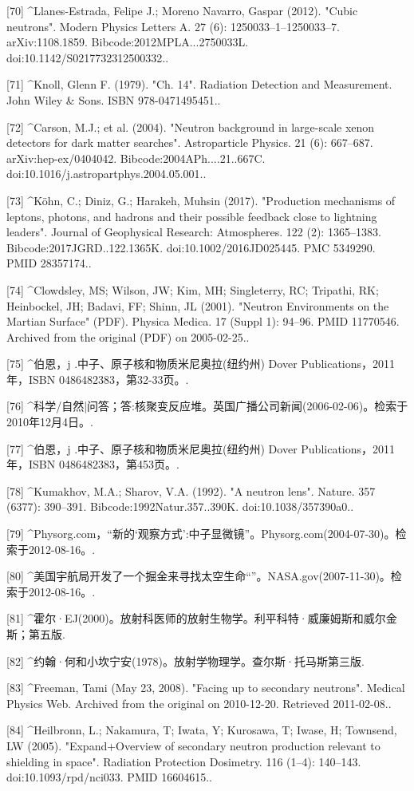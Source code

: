 [70]
^Llanes-Estrada, Felipe J.; Moreno Navarro, Gaspar (2012). "Cubic neutrons". Modern Physics Letters A. 27 (6): 1250033–1–1250033–7. arXiv:1108.1859. Bibcode:2012MPLA...2750033L. doi:10.1142/S0217732312500332..

[71]
^Knoll, Glenn F. (1979). "Ch. 14". Radiation Detection and Measurement. John Wiley & Sons. ISBN 978-0471495451..

[72]
^Carson, M.J.; et al. (2004). "Neutron background in large-scale xenon detectors for dark matter searches". Astroparticle Physics. 21 (6): 667–687. arXiv:hep-ex/0404042. Bibcode:2004APh....21..667C. doi:10.1016/j.astropartphys.2004.05.001..

[73]
^Köhn, C.; Diniz, G.; Harakeh, Muhsin (2017). "Production mechanisms of leptons, photons, and hadrons and their possible feedback close to lightning leaders". Journal of Geophysical Research: Atmospheres. 122 (2): 1365–1383. Bibcode:2017JGRD..122.1365K. doi:10.1002/2016JD025445. PMC 5349290. PMID 28357174..

[74]
^Clowdsley, MS; Wilson, JW; Kim, MH; Singleterry, RC; Tripathi, RK; Heinbockel, JH; Badavi, FF; Shinn, JL (2001). "Neutron Environments on the Martian Surface" (PDF). Physica Medica. 17 (Suppl 1): 94–96. PMID 11770546. Archived from the original (PDF) on 2005-02-25..

[75]
^伯恩，j .中子、原子核和物质米尼奥拉(纽约州) Dover Publications，2011年，ISBN 0486482383，第32-33页。.

[76]
^科学/自然|问答；答:核聚变反应堆。英国广播公司新闻(2006-02-06)。检索于2010年12月4日。.

[77]
^伯恩，j .中子、原子核和物质米尼奥拉(纽约州) Dover Publications，2011年，ISBN 0486482383，第453页。.

[78]
^Kumakhov, M.A.; Sharov, V.A. (1992). "A neutron lens". Nature. 357 (6377): 390–391. Bibcode:1992Natur.357..390K. doi:10.1038/357390a0..

[79]
^Physorg.com，“新的‘观察方式’:中子显微镜”。Physorg.com(2004-07-30)。检索于2012-08-16。.

[80]
^美国宇航局开发了一个掘金来寻找太空生命“”。NASA.gov(2007-11-30)。检索于2012-08-16。.

[81]
^霍尔·EJ(2000)。放射科医师的放射生物学。利平科特·威廉姆斯和威尔金斯；第五版.

[82]
^约翰·何和小坎宁安(1978)。放射学物理学。查尔斯·托马斯第三版.

[83]
^Freeman, Tami (May 23, 2008). "Facing up to secondary neutrons". Medical Physics Web. Archived from the original on 2010-12-20. Retrieved 2011-02-08..

[84]
^Heilbronn, L.; Nakamura, T; Iwata, Y; Kurosawa, T; Iwase, H; Townsend, LW (2005). "Expand+Overview of secondary neutron production relevant to shielding in space". Radiation Protection Dosimetry. 116 (1–4): 140–143. doi:10.1093/rpd/nci033. PMID 16604615..